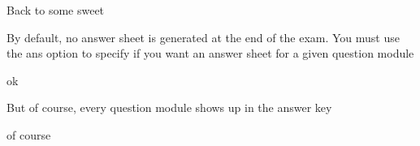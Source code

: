 \documentclass{exam}
\begin{document}
\begin{questions}
\setcounter{question}{27}
\question Back to some sweet
\question By default, no answer sheet is generated at the end of the exam. You must use the ans option to specify if you want an answer sheet for a given question module
	\begin{solution}[20 pt]
	ok
	\end{solution}
\question But of course, every question module shows up in the answer key
	\begin{solution}[20 pt]
	of course
	\end{solution}
\end{questions}
\newpage
\end{document}
